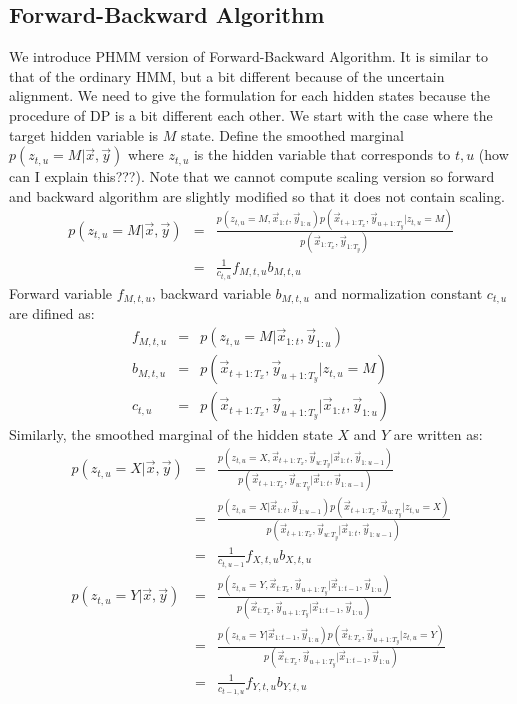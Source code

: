 \subsection{Forward-Backward Algorithm}
We introduce PHMM version of Forward-Backward Algorithm. 
It is similar to that of the ordinary HMM, but a bit different because of the uncertain alignment. 
We need to give the formulation for each hidden states because the procedure of DP is a bit different each other.
We start with the case where the target hidden variable is $M$ state. 
Define the smoothed marginal $p(z_{t, u} = M | \vec{x}, \vec{y})$ where $z_{t, u}$ is the hidden variable that corresponds to $t, u$ (how can I explain this???). Note that we cannot compute scaling version so forward and backward algorithm are slightly modified so that it does not contain scaling.
\begin{eqnarray}
  p(z_{t,u} = M | \vec{x}, \vec{y}) 
                            &=& \frac{ p(z_{t, u}=M , \vec{x}_{1:t}, \vec{y}_{1:u}) p(\vec{x}_{t+1:T_x}, \vec{y}_{u+1:T_y} | z_{t, u}= M) } {p(\vec{x}_{1:T_x}, \vec{y}_{1:T_y})} \nonumber \\
                            &=& \frac{1}{c_{t,u}} f_{M, t, u} b_{M, t, u}
\end{eqnarray}
Forward variable $f_{M, t, u}$, backward variable $b_{M, t, u}$ and normalization constant $c_{t, u}$ are difined as:
\begin{eqnarray}
  f_{M, t, u} &=& p(z_{t, u}=M | \vec{x}_{1:t}, \vec{y}_{1:u}) \\
  b_{M, t, u} &=& p(\vec{x}_{t+1:T_x}, \vec{y}_{u+1:T_y} | z_{t, u}= M) \\
  c_{t, u}    &=& p(\vec{x}_{t+1:T_x}, \vec{y}_{u+1:T_y}| \vec{x}_{1:t}, \vec{y}_{1:u})
\end{eqnarray}
Similarly, the smoothed marginal of the hidden state $X$ and $Y$ are written as:
\begin{eqnarray}
p(z_{t,u} = X | \vec{x}, \vec{y}) &=& \frac{ p(z_{t, u}=X, \vec{x}_{t+1:T_x}, \vec{y}_{u:T_y}| \vec{x}_{1:t}, \vec{y}_{1:u-1}) } {p(\vec{x}_{t+1:T_x}, \vec{y}_{u:T_y}| \vec{x}_{1:t}, \vec{y}_{1:u-1})} \nonumber\\
                            &=& \frac{ p(z_{t, u}=X | \vec{x}_{1:t}, \vec{y}_{1:u-1}) p(\vec{x}_{t+1:T_x}, \vec{y}_{u:T_y} | z_{t, u}= X) } {p(\vec{x}_{t+1:T_x}, \vec{y}_{u:T_y}| \vec{x}_{1:t}, \vec{y}_{1:u-1})} \nonumber \\
                            &=& \frac{1}{c_{t,u-1}} f_{X, t, u} b_{X, t, u} \\
p(z_{t,u} = Y | \vec{x}, \vec{y}) &=& \frac{ p(z_{t, u}=Y, \vec{x}_{t:T_x}, \vec{y}_{u+1:T_y}| \vec{x}_{1:t-1}, \vec{y}_{1:u}) } {p(\vec{x}_{t:T_x}, \vec{y}_{u+1:T_y}| \vec{x}_{1:t-1}, \vec{y}_{1:u})} \nonumber\\
                            &=& \frac{ p(z_{t, u}=Y | \vec{x}_{1:t-1}, \vec{y}_{1:u}) p(\vec{x}_{t:T_x}, \vec{y}_{u+1:T_y} | z_{t, u}= Y) } {p(\vec{x}_{t:T_x}, \vec{y}_{u+1:T_y}| \vec{x}_{1:t-1}, \vec{y}_{1:u})} \nonumber \\
                            &=& \frac{1}{c_{t-1,u}} f_{Y, t, u} b_{Y, t, u}
\end{eqnarray}
